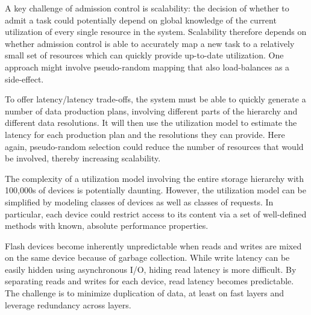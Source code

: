 \begin{tightItemize}

\item A key challenge of admission control is scalability: the
decision of whether to admit a task could potentially depend on
global knowledge of the current utilization of every single resource
in the system. Scalability therefore depends on whether admission
control is able to accurately map a new task to a relatively small
set of resources which can quickly provide up-to-date utilization.
One approach might involve pseudo-random mapping that also load-balances
as a side-effect.

\item To offer latency/latency trade-offs, the system must be able
to quickly generate a number of data production plans, involving
different parts of the hierarchy and different data resolutions.
It will then use the utilization model to estimate the latency for
each production plan and the resolutions they can provide. Here
again, pseudo-random selection could reduce the number of resources
that would be involved, thereby increasing scalability.

\item The complexity of a utilization model involving the entire
storage hierarchy with 100,000s of devices is potentially daunting.
However, the utilization model can be simplified by modeling classes
of devices as well as classes of requests. In particular, each
device could restrict access to its content via a set of well-defined
methods with known, absolute performance properties.

\item Flash devices become inherently unpredictable when reads and
writes are mixed on the same device because of garbage collection.
While write latency can be easily hidden using asynchronous I/O,
hiding read latency is more difficult. By separating reads and
writes for each device, read latency becomes predictable. The
challenge is to minimize duplication of data, at least on fast
layers and leverage redundancy across layers.

\end{tightItemize}



